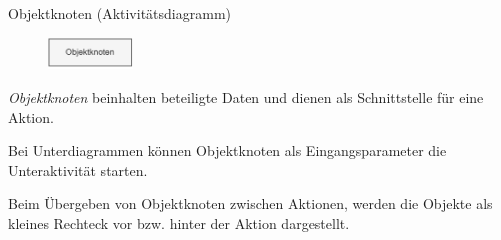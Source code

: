 \begin{diag}{Objektknoten (Aktivitätsdiagramm)}
    \begin{figure}
        \centering
        \includegraphics[width=0.2\textwidth]{includes/figures/defi_diagrams_activity_objektknoten.pdf}
    \end{figure}
    \emph{Objektknoten} beinhalten beteiligte Daten und dienen als Schnittstelle für eine Aktion.

    Bei Unterdiagrammen können Objektknoten als Eingangsparameter die Unteraktivität starten.

    Beim Übergeben von Objektknoten zwischen Aktionen, werden die Objekte als kleines Rechteck vor bzw. hinter der Aktion dargestellt.
\end{diag}

